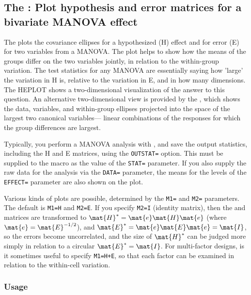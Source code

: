 
\subsection{The : Plot hypothesis and error matrices for a bivariate MANOVA effect }\label{mac:heplot}

The  plots the covariance ellipses for a hypothesized (H)
effect and for error (E) for two variables from a MANOVA.  The plot helps
to show how the means of the groups differ on the two variables
jointly, in relation to the within-group variation.  The test statistics
for any MANOVA are essentially saying how 'large' the variation in
H is, relative to the variation in E, and in how many dimensions.
The HEPLOT shows a two-dimensional visualization of the answer to this
question.  An alternative two-dimensional view is provided by the
, which shows the data, variables, and within-group ellipses
projected into the space of the largest two canonical variables---
linear combinations of the responses for which the group differences
are largest.

Typically, you perform a MANOVA analysis with , and save the
output statistics, including the H and E matrices, using the \texttt{OUTSTAT=}
option.  This must be supplied to the macro as the value of the
\texttt{STAT=} parameter.  If you also supply the raw data for the analysis
via the \texttt{DATA=} parameter, the means for the levels of the \texttt{EFFECT=}
parameter are also shown on the plot.

Various kinds of plots are possible, determined by the \texttt{M1=} and
\texttt{M2=} parameters.  The default is \texttt{M1=H} and \texttt{M2=E}.
If you specify \texttt{M2=I} (identity matrix), then the 
and  matrices are transformed to $\mat{H}^* = \mat{e}\mat{H}\mat{e}$ (where
$\mat{e}=\mat{E}^{-1/2}$), and $\mat{E}^*=\mat{e}\mat{E}\mat{e}=\mat{I}$,
so the errors become uncorrelated, and the size of $\mat{H}^*$ can be
judged more simply in relation to a circular $\mat{E}^*=\mat{I}$. For
multi-factor designs, is it sometimes useful to specify \texttt{M1=H+E},
so that each factor can be examined in relation to the within-cell
variation.

\subsubsection*{Usage}

